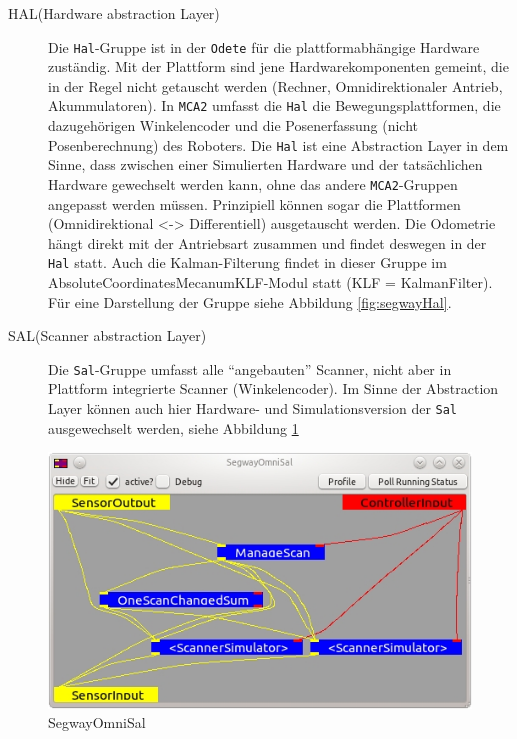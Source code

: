 \begin{description}
\item[HAL(Hardware abstraction Layer)] Die \lstinline{Hal}-Gruppe ist in der \lstinline{Odete} für die
plattformabhängige Hardware zuständig.
 Mit der Plattform sind jene Hardwarekomponenten gemeint, die in der Regel nicht getauscht werden 
 (Rechner, Omnidirektionaler Antrieb, Akummulatoren).
 In \lstinline{MCA2} umfasst die \lstinline{Hal} die Bewegungsplattformen, die dazugehörigen
 Winkelencoder und die Posenerfassung (nicht Posenberechnung) des Roboters. Die \lstinline{Hal} ist eine Abstraction Layer in dem Sinne, dass zwischen einer Simulierten
 Hardware und der tatsächlichen Hardware gewechselt werden kann, ohne das andere
 \lstinline{MCA2}-Gruppen angepasst werden müssen.
 Prinzipiell können sogar die Plattformen (Omnidirektional <-> Differentiell) ausgetauscht werden. Die Odometrie hängt
 direkt mit der Antriebsart zusammen und findet deswegen in der \lstinline{Hal} statt.
 Auch die Kalman-Filterung findet in dieser Gruppe im
 AbsoluteCoordinatesMecanumKLF-Modul statt (KLF = KalmanFilter). Für eine
 Darstellung der Gruppe siehe Abbildung \ref{fig:segwayHal}.
\item[SAL(Scanner abstraction Layer)] Die \lstinline{Sal}-Gruppe umfasst alle ``angebauten''
Scanner, nicht aber in Plattform integrierte Scanner (Winkelencoder).
 Im Sinne der Abstraction Layer können auch hier Hardware- und
 Simulationsversion der \lstinline{Sal} ausgewechselt werden, siehe Abbildung
 \ref{fig:SegwayOmniSal}
\end{description}
\begin{figure}[h]
\center
\includegraphics[scale=0.7]{graphics/SegwayOmniSal.jpg}
\caption{\label{fig:SegwayOmniSal} SegwayOmniSal}
\end{figure}


